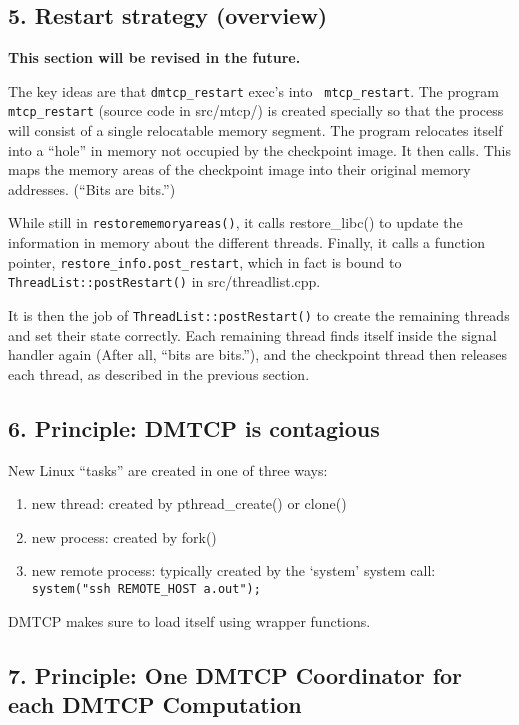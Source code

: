 \documentclass{article}
\begin{document}
\subsection*{5. Restart strategy (overview)}

{\bf This section will be revised in the future.}

The key ideas are that {\tt dmtcp\_restart} exec's into {\tt
mtcp\_restart}.  The program {\tt mtcp\_restart} (source code in
src/mtcp/) is created specially so that the process will consist of a
single relocatable memory segment.  The program relocates itself into
a ``hole'' in memory not occupied by the checkpoint image.  It then
calls.
This maps the memory areas of the checkpoint image into their original
memory addresses.  (``Bits are bits.'')

While still in {\tt restorememoryareas()}, it calls {restore\_libc()} to
update the information in memory about the different threads.  Finally,
it calls a function pointer, {\tt restore\_info.post\_restart}, which
in fact is bound to {\tt ThreadList::postRestart()} in src/threadlist.cpp.

It is then the job of {\tt ThreadList::postRestart()} to create the
remaining threads and set their state correctly.  Each remaining thread
finds itself inside the signal handler again (After all, ``bits are
bits.''), and the checkpoint thread then releases each thread, as
described in the previous section.


\subsection*{6. Principle:  DMTCP is contagious}

New Linux ``tasks'' are created in one of three ways:
\begin{enumerate}
  \item new thread: created by pthread\_create() or clone()
  \item new process: created by fork()
  \item new remote process: typically created by the `system' system call: \\
	{\tt system("ssh REMOTE\_HOST a.out");}
\end{enumerate}

DMTCP makes sure to load itself using wrapper functions.


\subsection*{7. Principle:  One DMTCP Coordinator for each DMTCP Computation}
\end{document}
